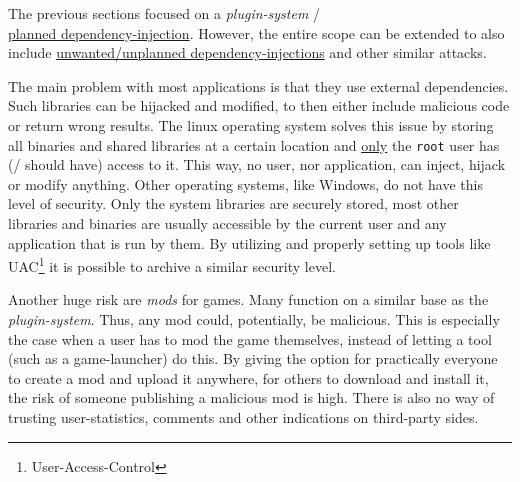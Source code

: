 The previous sections focused on a \textit{plugin-system} /\\ \underline{planned dependency-injection}.
However, the entire scope can be extended to also include \underline{unwanted/unplanned dependency-injections} and other similar attacks.

The main problem with most applications is that they use external dependencies.
Such libraries can be hijacked and modified, to then either include malicious code or return wrong results.
The linux operating system solves this issue by storing all binaries and shared libraries at a certain location and \underline{only} the \texttt{root} user has (/ should have) access to it.
This way, no user, nor application, can inject, hijack or modify anything.
Other operating systems, like Windows, do not have this level of security.
Only the system libraries are securely stored, most other libraries and binaries are usually accessible by the current user and any application that is run by them.
By utilizing and properly setting up tools like UAC\footnote{User-Access-Control} it is possible to archive a similar security level.

Another huge risk are \textit{mods} for games.
Many function on a similar base as the \textit{plugin-system}.
Thus, any mod could, potentially, be malicious.
This is especially the case when a user has to mod the game themselves, instead of letting a tool (such as a game-launcher) do this.
By giving the option for practically everyone to create a mod and upload it anywhere, for others to download and install it, the risk of someone publishing a malicious mod is high.
There is also no way of trusting user-statistics, comments and other indications on third-party sides.

